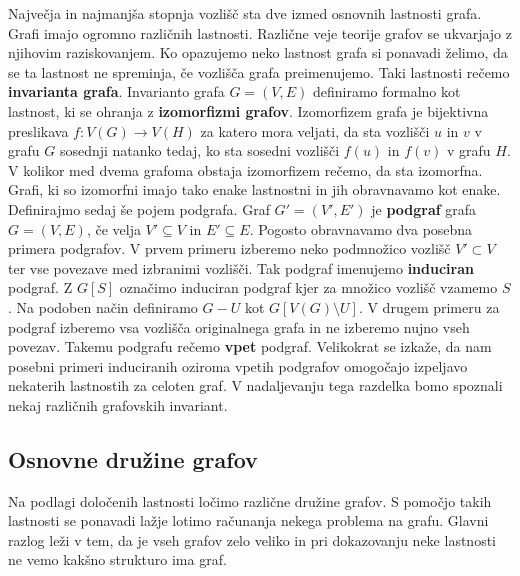 \documentclass[12pt,a4paper,twoside]{article}
\theoremstyle{definition} %
\theoremstyle{plain} %
\numberwithin{equation}{section}  %
\begin{document}
Največja in najmanjša stopnja vozlišč sta dve izmed osnovnih lastnosti grafa. Grafi imajo ogromno različnih lastnosti. Različne veje teorije grafov se ukvarjajo z njihovim raziskovanjem. Ko opazujemo neko lastnost grafa si ponavadi želimo, da se ta lastnost ne spreminja, če vozlišča grafa preimenujemo. Taki lastnosti rečemo \textbf{invarianta grafa}. Invarianto grafa $G = (V, E)$ definiramo formalno kot lastnost, ki se ohranja z \textbf{izomorfizmi grafov}. Izomorfizem grafa je bijektivna preslikava $f: V(G) \rightarrow V(H)$ za katero mora veljati, da sta vozlišči $u$ in $v$ v grafu $G$ sosednji natanko tedaj, ko sta sosedni vozlišči $f(u)$ in $f(v)$ v grafu $H$. V kolikor med dvema grafoma obstaja izomorfizem rečemo, da sta izomorfna. Grafi, ki so izomorfni imajo tako enake lastnostni in jih obravnavamo kot enake. Definirajmo sedaj še pojem podgrafa. Graf $G' = (V', E')$ je \textbf{podgraf} grafa $G = (V, E)$, če velja $ V' \subseteq V$ in $E' \subseteq E$. Pogosto obravnavamo dva posebna primera podgrafov. V prvem primeru izberemo neko podmnožico vozlišč $V' \subset V$ ter vse povezave med izbranimi vozlišči. Tak podgraf imenujemo \textbf{induciran} podgraf. Z $G[S]$ označimo induciran podgraf kjer za množico vozlišč vzamemo $S$. Na podoben način definiramo $G - U$ kot $G[V(G) \setminus U]$. V drugem primeru za podgraf izberemo vsa vozlišča originalnega grafa in ne izberemo nujno vseh povezav. Takemu podgrafu rečemo \textbf{vpet} podgraf. Velikokrat se izkaže, da nam posebni primeri induciranih oziroma vpetih podgrafov omogočajo izpeljavo nekaterih lastnostih za celoten graf. V nadaljevanju tega razdelka bomo spoznali nekaj različnih grafovskih invariant.

\subsection{Osnovne družine grafov}
Na podlagi določenih lastnosti ločimo različne družine grafov. S pomočjo takih lastnosti se ponavadi lažje lotimo računanja nekega problema na grafu. Glavni razlog leži v tem, da je vseh grafov zelo veliko in pri dokazovanju neke lastnosti ne vemo kakšno strukturo ima graf. 
\end{document}
